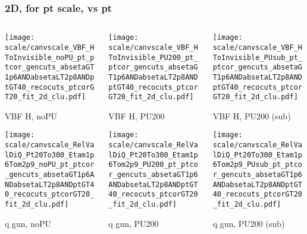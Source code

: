 \documentclass[8pt]{beamer}
\begin{document}
 \begin{frame}
  \frametitle{2D, for pt scale, vs pt}
  
  \begin{columns}
   \begin{column}{0.35\textwidth}
     \texttt{[image: scale/canvscale\_VBF\_HToInvisible\_noPU\_pt\_ptcor\_gencuts\_absetaGT1p6ANDabsetaLT2p8ANDptGT40\_recocuts\_ptcorGT20\_fit\_2d\_clu.pdf]}
     
     VBF H, noPU
    
     \texttt{[image: scale/canvscale\_RelValDiQ\_Pt20To300\_Etam1p6Tom2p9\_noPU\_pt\_ptcor\_gencuts\_absetaGT1p6ANDabsetaLT2p8ANDptGT40\_recocuts\_ptcorGT20\_fit\_2d\_clu.pdf]}
     
     q gun, noPU
   \end{column}
   \begin{column}{0.35\textwidth}
     \texttt{[image: scale/canvscale\_VBF\_HToInvisible\_PU200\_pt\_ptcor\_gencuts\_absetaGT1p6ANDabsetaLT2p8ANDptGT40\_recocuts\_ptcorGT20\_fit\_2d\_clu.pdf]}
     
     VBF H, PU200
    
     \texttt{[image: scale/canvscale\_RelValDiQ\_Pt20To300\_Etam1p6Tom2p9\_PU200\_pt\_ptcor\_gencuts\_absetaGT1p6ANDabsetaLT2p8ANDptGT40\_recocuts\_ptcorGT20\_fit\_2d\_clu.pdf]}
     
     q gun, PU200
   \end{column}
   \begin{column}{0.35\textwidth}
     \texttt{[image: scale/canvscale\_VBF\_HToInvisible\_PUsub\_pt\_ptcor\_gencuts\_absetaGT1p6ANDabsetaLT2p8ANDptGT40\_recocuts\_ptcorGT20\_fit\_2d\_clu.pdf]}
     
     VBF H, PU200 (sub)
    
     \texttt{[image: scale/canvscale\_RelValDiQ\_Pt20To300\_Etam1p6Tom2p9\_PUsub\_pt\_ptcor\_gencuts\_absetaGT1p6ANDabsetaLT2p8ANDptGT40\_recocuts\_ptcorGT20\_fit\_2d\_clu.pdf]}
     
     q gun, PU200 (sub)
   \end{column}
  \end{columns}
 \end{frame}
\end{document}
